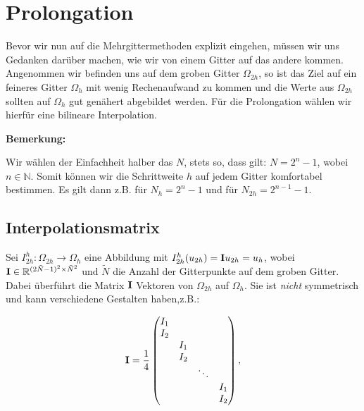 




\section{Prolongation}

Bevor wir nun auf die Mehrgittermethoden explizit eingehen, müssen wir uns Gedanken darüber machen, wie wir von einem Gitter auf das andere kommen. Angenommen wir befinden uns auf dem groben Gitter $\Omega_{2h}$, so ist das Ziel auf ein feineres Gitter $\Omega_{h}$ mit wenig Rechenaufwand zu kommen und die Werte aus $\Omega_{2h}$ sollten auf $\Omega_{h}$ gut genähert abgebildet werden. Für die Prolongation wählen wir hierfür eine bilineare Interpolation.


\textbf{Bemerkung:}

Wir wählen der Einfachheit halber das $N$, stets so, dass gilt: $N = 2^{n} - 1$, wobei $n \in \mathbb{N}$. Somit können wir die Schrittweite $h$ auf jedem Gitter komfortabel bestimmen. Es gilt dann z.B. für $N_{h} = 2^{n} - 1$ und für $N_{2h} = 2^{n-1} - 1$.

\subsection{Interpolationsmatrix}

Sei $I^{h}_{2h}: \Omega_{2h} \longrightarrow \Omega_{h}$ eine Abbildung mit $I_{2h}^{h}(u_{2h}) = {\textbf{I}}u_{2h} = u_{h}$, wobei ${\textbf{I}} \in \mathbb{R}^{(2 \tilde N - 1)^{2} \times \tilde N^{2}}$ und $\tilde N$ die Anzahl der Gitterpunkte auf dem groben Gitter. Dabei überführt die Matrix ${\textbf{I}}$ Vektoren von $\Omega_{2h}$ auf $\Omega_{h}$. Sie ist \textit{nicht} symmetrisch und kann verschiedene Gestalten haben,z.B.:

\begin{equation}
{\textbf{I}} = \frac {1} {4}
\begin{pmatrix}
I_{1} & & &\\
I_{2} & & &\\
& I_{1} & &\\
& I_{2} & &\\
& & \ddots &\\
& & & I_{1}\\
& & & I_{2}
\end{pmatrix},
\end{equation}


